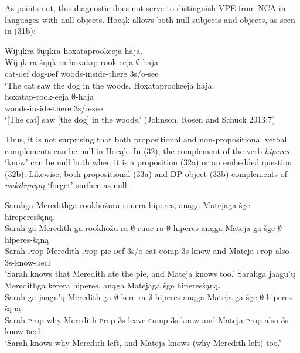 \documentclass[output=paper]{LSP/langsci}
\begin{document}
As \citet{Fortin2007} points out, this diagnostic does not serve to distinguish VPE from NCA in languages with null objects. Hocąk allows both null subjects and objects, as seen in (31b):

\begin{exe}
\ex
\begin{xlist}
\ex
\glll Wijųkra šųųkra hoxataprookeeja haja.\\
Wijųk-ra šųųk-ra hoxatap-rook-eeja $\emptyset$-haja\\
cat-{\textsc def} dog-{\textsc def} woods-inside-there {\textsc 3s/o}-see\\
\trans `The cat saw the dog in the woods.
\ex
\glll Hoxataprookeeja haja.\\
hoxatap-rook-eeja $\emptyset$-haja\\
woods-inside-there {\textsc 3s/o}-see\\
\trans `[The cat] saw [the dog] in the woods.' (Johnson, Rosen and Schuck 2013:7)
\end{xlist}
\end{exe}


Thus, it is not surprising that both propositional and non-propositional verbal complements can be null in Hocąk. In (32), the complement of the verb \emph{hiperes} `know' can be null both when it is a proposition (32a) or an embedded question (32b). Likewise, both propositional (33a) and DP object (33b) complements of \emph{wakikųnųnį} `forget' surface as null.

\begin{exe}
\ex
\begin{xlist}
\ex
\glll Sarahga Meredithga rookhožura ruucra hiperes, anąga Matejaga šge hireperesšąną.\\
Sarah-ga Meredith-ga rookhožu-ra $\emptyset$-ruuc-ra $\emptyset$-hiperes anąga Mateja-ga šge $\emptyset$-hiperes-šąną\\
Sarah-{\textsc prop} Meredith-{\textsc prop} pie-{\textsc def} {\textsc 3s/o}-eat-{\textsc comp} {\textsc 3s}-know and Mateja-{\textsc prop} also {\textsc 3s}-know-{\textsc decl}\\
\trans `Sarah knows that Meredith ate the pie, and Mateja knows too.'
\ex
\glll Sarahga jaagu'ų Meredithga kerera hiperes, anąga Matejaga šge hiperesšąną.\\
Sarah-ga jaagu'ų Meredith-ga $\emptyset$-kere-ra $\emptyset$-hiperes anąga Mateja-ga šge $\emptyset$-hiperes-šąną\\
Sarah-{\textsc prop} why Meredith-{\textsc prop} {\textsc 3s}-leave-{\textsc comp} {\textsc 3s}-know and Mateja-{\textsc prop} also {\textsc 3s}-know-{\textsc decl}\\
\trans `Sarah knows why Meredith left, and Mateja knows (why Meredith left) too.'
\end{xlist}
\end{exe}
\end{document}

